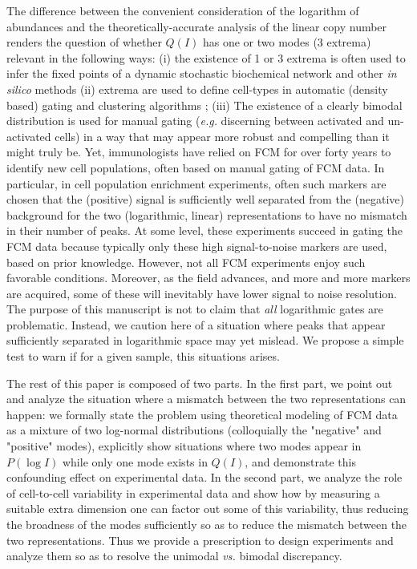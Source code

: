 \documentclass[11pt,a4paper,draft]{article}
\begin{document}
The difference between the convenient consideration of the logarithm of abundances and the theoretically-accurate analysis of the linear copy number renders the question of whether $Q(I)$ has one or two modes (3 extrema) relevant in the following ways: (i) the existence of 1 or 3 extrema is often used to infer the fixed points of a dynamic stochastic biochemical network \cite{Friedman2006,Pal2015,Vogel2016} and other \emph{in silico} methods \cite{Das2009} (ii) extrema are used to define cell-types in automatic (density based) gating and clustering algorithms \cite{Cron2013,ONeill2013,Anchang2014,Finak2014,Saeys2016,Chen2016}; (iii) The existence of a clearly bimodal distribution is used for manual gating ({\it e.g.} discerning between activated and un-activated cells) in a way that may appear more robust and compelling than it might truly be. Yet, immunologists have relied on FCM for over forty years to identify new cell populations, often based on manual gating of FCM data. In particular, in cell population enrichment experiments, often such markers are chosen that the (positive) signal is sufficiently well separated from the (negative) background for the two (logarithmic, linear) representations to have no mismatch in their number of peaks. At some level, these experiments succeed in gating the FCM data because typically only these high signal-to-noise markers are used, based on prior knowledge. However, not all FCM experiments enjoy such favorable conditions. Moreover, as the field advances, and more and more markers are acquired, some of these will inevitably have lower signal to noise resolution. The purpose of this manuscript is not to claim that \emph{all} logarithmic gates are problematic. Instead, we caution here of a situation where peaks that appear sufficiently separated in logarithmic space may yet mislead. We propose a simple test to warn if for a given sample, this situations arises.

\smallskip
The rest of this paper is composed of two parts. In the first part, we point out and analyze the situation where a mismatch between the two representations can happen: we formally state the problem using theoretical modeling of FCM data as a mixture of two log-normal distributions (colloquially the "negative" and "positive" modes), explicitly show situations where two modes appear in $P(\log I)$ while only one mode exists in $Q(I)$, and demonstrate this confounding effect on experimental data. In the second part, we analyze the role of cell-to-cell variability in experimental data and show how by measuring a suitable extra dimension one can factor out some of this variability, thus reducing the broadness of the modes sufficiently so as to reduce the mismatch between the two representations. Thus we provide a prescription to design experiments and analyze them so as to resolve the unimodal {\it vs.} bimodal discrepancy. 
\end{document}
